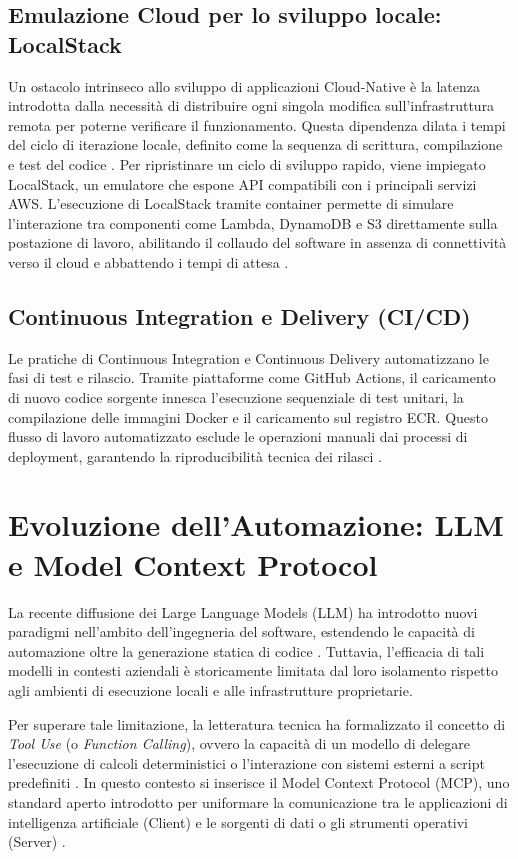 \subsection{Emulazione Cloud per lo sviluppo locale: LocalStack}
Un ostacolo intrinseco allo sviluppo di applicazioni Cloud-Native è la latenza introdotta dalla necessità di distribuire ogni singola modifica sull'infrastruttura remota per poterne verificare il funzionamento. Questa dipendenza dilata i tempi del ciclo di iterazione locale, definito come la sequenza di scrittura, compilazione e test del codice \cite{RedHatInnerLoop}.
Per ripristinare un ciclo di sviluppo rapido, viene impiegato LocalStack, un emulatore che espone API compatibili con i principali servizi AWS. L'esecuzione di LocalStack tramite container permette di simulare l'interazione tra componenti come Lambda, DynamoDB e S3 direttamente sulla postazione di lavoro, abilitando il collaudo del software in assenza di connettività verso il cloud e abbattendo i tempi di attesa \cite{LocalStackPaper}.

\subsection{Continuous Integration e Delivery (CI/CD)}
Le pratiche di Continuous Integration e Continuous Delivery automatizzano le fasi di test e rilascio. Tramite piattaforme come GitHub Actions, il caricamento di nuovo codice sorgente innesca l'esecuzione sequenziale di test unitari, la compilazione delle immagini Docker e il caricamento sul registro ECR. Questo flusso di lavoro automatizzato esclude le operazioni manuali dai processi di deployment, garantendo la riproducibilità tecnica dei rilasci \cite{AccelerateBook}.

\section{Evoluzione dell'Automazione: LLM e Model Context Protocol}
\label{sec:mcp_background}

La recente diffusione dei Large Language Models (LLM) ha introdotto nuovi paradigmi nell'ambito dell'ingegneria del software, estendendo le capacità di automazione oltre la generazione statica di codice \cite{LLMSoftwareEngineering}. Tuttavia, l'efficacia di tali modelli in contesti aziendali è storicamente limitata dal loro isolamento rispetto agli ambienti di esecuzione locali e alle infrastrutture proprietarie.

Per superare tale limitazione, la letteratura tecnica ha formalizzato il concetto di \textit{Tool Use} (o \textit{Function Calling}), ovvero la capacità di un modello di delegare l'esecuzione di calcoli deterministici o l'interazione con sistemi esterni a script predefiniti \cite{LLMTool}.
In questo contesto si inserisce il Model Context Protocol (MCP), uno standard aperto introdotto per uniformare la comunicazione tra le applicazioni di intelligenza artificiale (Client) e le sorgenti di dati o gli strumenti operativi (Server) \cite{MCP}.

